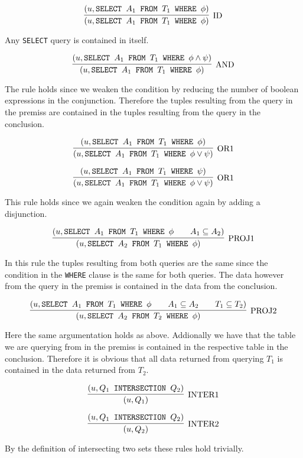 \[
\infer[\text{ID}]
	{(u,\text{\texttt{SELECT $A_1$ FROM $T_1$ WHERE $\phi$}})}
	{(u,\text{\texttt{SELECT $A_1$ FROM $T_1$ WHERE $\phi$}})}
\]

Any \texttt{SELECT} query is contained in itself.

\[
\infer[\text{AND}]
	{(u,\text{\texttt{SELECT $A_1$ FROM $T_1$ WHERE $\phi$}})}
	{(u,\text{\texttt{SELECT $A_1$ FROM $T_1$ WHERE $\phi \land \psi$}})}
\]

The rule holds since we weaken the condition by reducing the number of boolean expressions in the conjunction. Therefore the tuples resulting from the query in the premiss are contained in the tuples resulting from the query in the conclusion.

\[
\infer[\text{OR1}]
	{(u,\text{\texttt{SELECT $A_1$ FROM $T_1$ WHERE $\phi \lor \psi$}})}
	{(u,\text{\texttt{SELECT $A_1$ FROM $T_1$ WHERE $\phi$}})}
\]

\[
\infer[\text{OR1}]
	{(u,\text{\texttt{SELECT $A_1$ FROM $T_1$ WHERE $\phi \lor \psi$}})}
	{(u,\text{\texttt{SELECT $A_1$ FROM $T_1$ WHERE $\psi$}})}
\]

This rule holds since we again weaken the condition again by adding a disjunction.

\[
\infer[\text{PROJ1}]
	{(u,\text{\texttt{SELECT $A_2$ FROM $T_1$ WHERE $\phi$}})}
	{(u,\text{\texttt{SELECT $A_1$ FROM $T_1$ WHERE $\phi$}} \qquad A_1 \subseteq A_2)}
\]

In this rule the tuples resulting from both queries are the same since the condition in the \texttt{WHERE} clause is the same for both queries. The data however from the query in the premiss is contained in the data from the conclusion.

\[
\infer[\text{PROJ2}]
	{(u,\text{\texttt{SELECT $A_2$ FROM $T_2$ WHERE $\phi$}})}
	{(u,\text{\texttt{SELECT $A_1$ FROM $T_1$ WHERE $\phi$}} \qquad A_1 \subseteq A_2 \qquad T_1 \subseteq T_2)}
\]

Here the same argumentation holds as above. Addionally we have that the table we are querying from in the premiss is contained in the respective table in the conclusion. Therefore it is obvious that all data returned from querying $T_1$ is contained in the data returned from $T_2$.

\[
\infer[\text{INTER1}]
	{(u,Q_1)}
	{(u,Q_1 \text{\texttt{ INTERSECTION }} Q_2)}
\]

\[
\infer[\text{INTER2}]
	{(u,Q_2)}
	{(u,Q_1 \text{\texttt{ INTERSECTION }} Q_2)}
\]

By the definition of intersecting two sets these rules hold trivially.

